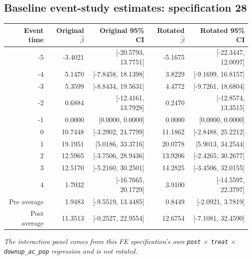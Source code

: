 \documentclass[10pt]{article}
\begin{document}
\subsection*{Baseline event-study estimates: specification 28}
\begin{center}
\scriptsize
\begin{tabular}{r rr rr}
\toprule
Event time & Original $\hat\beta$ & Original 95\% CI & Rotated $\hat\beta$ & Rotated 95\% CI \\
\midrule
-5 & -3.4021 & [-20.5793, 13.7751] & -5.1675 & [-22.3447, 12.0097] \\
-4 & 5.1470 & [-7.8458, 18.1398] & 3.8229 & [-9.1699, 16.8157] \\
-3 & 5.3599 & [-8.8434, 19.5631] & 4.4772 & [-9.7261, 18.6804] \\
-2 & 0.6884 & [-12.4161, 13.7928] & 0.2470 & [-12.8574, 13.3515] \\
-1 & 0.0000 & [0.0000, 0.0000] & 0.0000 & [0.0000, 0.0000] \\
0 & 10.7448 & [-3.2902, 24.7799] & 11.1862 & [-2.8488, 25.2212] \\
1 & 19.1951 & [5.0186, 33.3716] & 20.0778 & [5.9013, 34.2544] \\
2 & 12.5965 & [-3.7506, 28.9436] & 13.9206 & [-2.4265, 30.2677] \\
3 & 12.5170 & [-5.2160, 30.2501] & 14.2825 & [-3.4506, 32.0155] \\
4 & 1.7032 & [-16.7665, 20.1729] & 3.9100 & [-14.5597, 22.3797] \\
\midrule
Pre average & 1.9483 & [-9.5519, 13.4485] & 0.8449 & [-2.0921, 3.7819] \\
Post average & 11.3513 & [-0.2527, 22.9554] & 12.6754 & [-7.1081, 32.4590] \\
\bottomrule
\end{tabular}
\end{center}
\medskip
\textit{The interaction panel comes from this FE specification's own \texttt{post} $\times$ \texttt{treat} $\times$ \texttt{downup\_ac\_pop} regression and is not rotated.}
\clearpage
\end{document}
